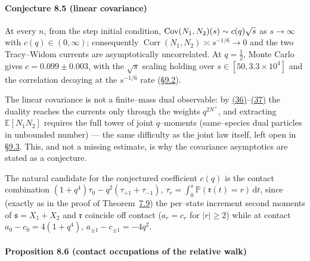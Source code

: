 \documentclass[11pt]{article}
\theoremstyle{plain}
\theoremstyle{definition}
\theoremstyle{remark}
\DeclareMathOperator{\Corr}{Corr}\DeclareMathOperator{\cum}{cum}
\newcommand{\E}{\mathbb{E}}\newcommand{\PP}{\mathbb{P}}\newcommand{\dd}{\,\mathrm{d}}
\begin{document}
\paragraph{Conjecture 8.5 (linear covariance)}\label{conj_cov}

At every $n$, from the step initial condition,
$\operatorname{Cov}(N_1,N_2)(s)\sim c(q)\sqrt s$ as $s\to\infty$ with $c(q)\in(0,\infty)$;
consequently $\Corr(N_1,N_2)\asymp s^{-1/6}\to0$ and the two Tracy--Widom currents
are asymptotically uncorrelated. At $q=\tfrac12$, Monte Carlo gives
$c=0.099\pm0.003$, with the $\sqrt s$ scaling holding over
$s\in[50,3.3\times10^4]$ and the correlation decaying at the $s^{-1/6}$ rate
(\S\hyperref[sec_numerics]{9.2}).
\par

The linear covariance is not a finite--mass dual observable: by
\hyperref[eq_tri1]{(36)}--\hyperref[eq_tri2]{(37)} the duality reaches the currents only through the
weights $q^{2N^+}$, and extracting $\E[N_1N_2]$ requires the full tower of joint
$q$--moments (same--species dual particles in unbounded number) --- the same
difficulty as the joint law itself, left open in \S\hyperref[sec_disc]{9.3}. This, and not a
missing estimate, is why the covariance asymptotics are stated as a conjecture.

The natural candidate for the conjectured coefficient $c(q)$ is the contact
combination
$(1+q^4)\tau_0-q^2(\tau_{+1}+\tau_{-1})$, $\tau_r=\int_0^s\PP(\mathfrak r(t)=r)\dd t$,
since (exactly as in the proof of Theorem~\hyperref[thm_closed]{7.9}) the per--state increment
second moments of $\mathfrak s=X_1+X_2$ and $\mathfrak r$ coincide off contact
($a_r=c_r$ for $|r|\ge2$) while at contact $a_0-c_0=4(1+q^4)$,
$a_{\pm1}-c_{\pm1}=-4q^2$. 

\paragraph{Proposition 8.6 (contact occupations of the relative walk)}\label{prop_occ}
\end{document}
